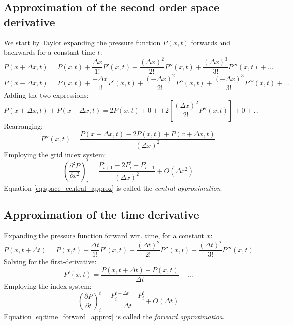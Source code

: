 \subsection{Approximation of the second order space derivative} %
\label{sub:approximation_of_the_second_order_space_derivative}
We start by Taylor expanding the pressure function $P(x,t)$ forwards and backwards for a constant time $t$:
\begin{equation}
  P(x + \Delta x, t) = P(x,t) + \frac{\Delta x}{1!} P'(x,t)
                              + \frac{(\Delta x)^2}{2!} P''(x,t)
                              + \frac{(\Delta x)^3}{3!} P'''(x,t) + \ldots
\end{equation}
\begin{equation}
  P(x - \Delta x, t) = P(x,t) + \frac{-\Delta x}{1!} P'(x,t)
                              + \frac{(-\Delta x)^2}{2!} P''(x,t)
                              + \frac{(-\Delta x)^3}{3!} P'''(x,t) + \ldots
\end{equation}
Adding the two expressions:
\begin{equation}
  P(x + \Delta x, t) + P(x - \Delta x, t) 
                              = 2 P(x,t) + 0 + 
                              + 2\left[\frac{(\Delta x)^2}{2!} P''(x,t)\right]
                              + 0 + \ldots
\end{equation}
Rearranging:
\begin{equation}
  P''(x,t) = \frac{P(x-\Delta x,t) - 2P(x,t) + P(x+\Delta x, t)}{(\Delta x)^2}
\end{equation}
Employing the grid index system:
\begin{equation}
  \left( \frac{\partial^2 P}{\partial x^2} \right)_i^t
  = \frac{P_{i+1}^t - 2P_i^t + P_{i-1}^t}{(\Delta x)^2} + O(\Delta x^2)
  \label{eq:space_central_approx}
\end{equation}
Equation \eqref{eq:space_central_approx} is called the \emph{central approximation}.

\subsection{Approximation of the time derivative} %
\label{sub:approximation_of_the_time_derivative}
Expanding the pressure function forward wrt. time, for a constant $x$:
\begin{equation}
  P(x, t+\Delta t) = P(x,t) + \frac{\Delta t}{1!} P'(x,t)
                            + \frac{(\Delta t)^2}{2!} P''(x,t)
                            + \frac{(\Delta t)^2}{3!} P'''(x,t)
\end{equation}
Solving for the first-derivative:
\begin{equation}
  P'(x,t) = \frac{P(x,t+\Delta t) - P(x,t)}{\Delta t} + \ldots
\end{equation}
Employing the index system:
\begin{equation}
  \left( \frac{\partial P}{\partial t} \right)_i^t 
  = \frac{P_i^{t+\Delta t} - P_i^t}{\Delta t} + O(\Delta t)
  \label{eq:time_forward_approx}
\end{equation}
Equation \eqref{eq:time_forward_approx} is called the \emph{forward approximation}.

